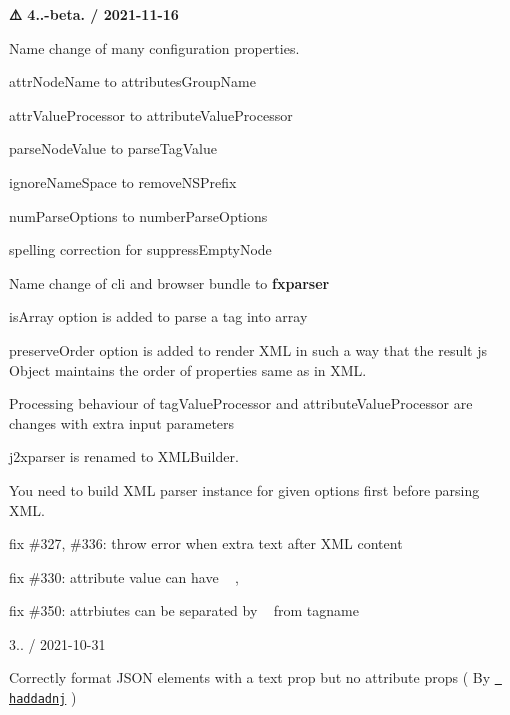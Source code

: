 {\bfseries{⚠️ 4..-\/beta. / 2021-\/11-\/16}}
\begin{DoxyItemize}
\item Name change of many configuration properties.
\begin{DoxyItemize}
\item {\ttfamily attr\+Node\+Name} to {\ttfamily attributes\+Group\+Name}
\item {\ttfamily attr\+Value\+Processor} to {\ttfamily attribute\+Value\+Processor}
\item {\ttfamily parse\+Node\+Value} to {\ttfamily parse\+Tag\+Value}
\item {\ttfamily ignore\+Name\+Space} to {\ttfamily remove\+NSPrefix}
\item {\ttfamily num\+Parse\+Options} to {\ttfamily number\+Parse\+Options}
\item spelling correction for {\ttfamily suppress\+Empty\+Node}
\end{DoxyItemize}
\item Name change of cli and browser bundle to {\bfseries{fxparser}}
\item {\ttfamily is\+Array} option is added to parse a tag into array
\item {\ttfamily preserve\+Order} option is added to render XML in such a way that the result js Object maintains the order of properties same as in XML.
\item Processing behaviour of {\ttfamily tag\+Value\+Processor} and {\ttfamily attribute\+Value\+Processor} are changes with extra input parameters
\item j2xparser is renamed to XMLBuilder.
\item You need to build XML parser instance for given options first before parsing XML.
\item fix \#327, \#336\+: throw error when extra text after XML content
\item fix \#330\+: attribute value can have \textquotesingle{}~\newline
\textquotesingle{},
\item fix \#350\+: attrbiutes can be separated by \textquotesingle{}~\newline
\textquotesingle{} from tagname
\end{DoxyItemize}

3.. / 2021-\/10-\/31
\begin{DoxyItemize}
\item Correctly format JSON elements with a text prop but no attribute props ( By \href{https://github.com/haddadnj}{\texttt{ haddadnj}} )
\end{DoxyItemize}

